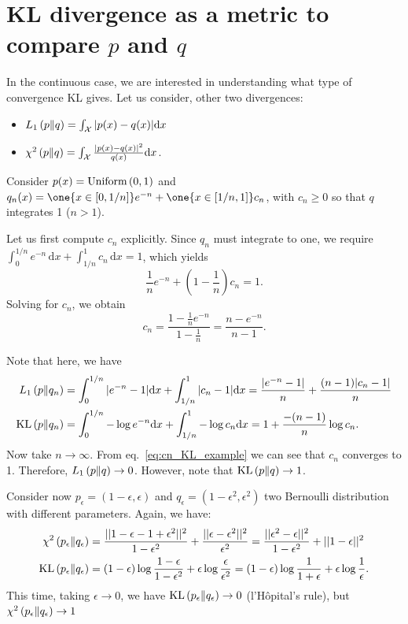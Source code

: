 \section[KL divergence as a way to compare distributions]{KL divergence as a metric to compare $p$ and $q$}

In the continuous case, we are interested in understanding what type of convergence KL gives. Let us consider, other two divergences: 
\begin{itemize}
	\item $L_1\left(p\middle\|q\right) = \int_{\mathcal X}|p(x)-q(x)|{\text{d}x}$
	\item $\chi^2\left(p\middle\|q\right) = \int_{\mathcal X} \frac{|p(x)-q(x)|^2}{q(x)}{\text{d}x}$.
\end{itemize}

\begin{example}[KL versus $L_1$]
	Consider $p(x)=\text{Uniform}\left(0,1\right)$ and $q_n(x) = \one{x\in[0,1/n]}e^{-n} + \one{x\in[1/n,1]} c_n $, with $c_n\ge 0$ so that $q$ integrates 1 ($n > 1$). 
	
	Let us first compute $c_n$ explicitly. Since $q_n$ must integrate to one, we require $\int_0^{1/n} e^{-n}\,\mathrm{d}x + \int_{1/n}^1 c_n\,\mathrm{d}x = 1$,
	which yields
	\[
	\frac{1}{n}e^{-n} + \left(1-\frac{1}{n}\right)c_n = 1.
	\]
	Solving for $c_n$, we obtain
	\begin{equation}
		c_n = \frac{1-\frac{1}{n}e^{-n}}{1-\frac{1}{n}} = \frac{n-e^{-n}}{n-1}.	\label{eq:cn_KL_example}
	\end{equation}

	Note that here, we have
	\begin{align}
		L_1\left(p\middle\|q_n\right) &= \int_0^{1/n} |e^{-n}-1|{\text{d}x} + \int_{1/n}^1 |c_n -1|{\text{d}x} = \frac{|e^{-n}-1|}{n} + \frac{(n-1)|c_n-1|}{n}\\
		\text{KL}\left(p\middle\|q_n\right) &=  \int_0^{1/n} -\log e^{-n} {\text{d}x} + \int_{1/n}^1 -\log c_n {\text{d}x} =  1 + \frac{-(n-1)}{n}\log c_n.
	\end{align}
	Now take $n\to\infty$. From eq.~\eqref{eq:cn_KL_example} we can see that $c_n$ converges to 1. Therefore, $L_1\left(p\middle\|q\right)\to 0$. However, note that $\text{KL}\left(p\middle\|q\right) \to 1$.  
\end{example}

\begin{example}
	Consider now $p_\epsilon=(1-\epsilon, \epsilon)$ and $q_\epsilon=(1-\epsilon^2, \epsilon^2)$ two Bernoulli distribution with different parameters. Again, we have: 
		\begin{align}
		\chi^2\left(p_\epsilon\middle\|q_\epsilon\right) &= \frac{||1-\epsilon - 1 + \epsilon^2||^2}{1-\epsilon^2} + \frac{||\epsilon-\epsilon^2||^2}{\epsilon^2}= \frac{||\epsilon^2 - \epsilon||^2}{1-\epsilon^2} + ||1-\epsilon||^2 \\
		\text{KL}\left(p_\epsilon\middle\|q_\epsilon\right) &=  (1-\epsilon)\log\frac{1-\epsilon}{1-\epsilon^2} + \epsilon\log\frac{\epsilon}{\epsilon^2}=  (1-\epsilon)\log\frac{1}{1+\epsilon} + \epsilon\log \frac{1}{\epsilon}.
	\end{align}
	This time, taking $\epsilon\to 0$, we have $\text{KL}\left(p_\epsilon\middle\|q_\epsilon\right) \to 0$ (l’Hôpital’s rule), but $\chi^2\left(p_\epsilon\middle\|q_\epsilon\right) \to 1$
\end{example}

